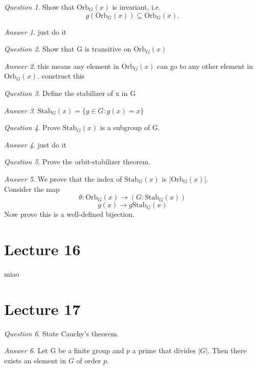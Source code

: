 \documentclass[]{article}
\theoremstyle{remark}
\theoremstyle{qnstyle}
\newtheorem{question}{Question}
\theoremstyle{answerstyle}
\newtheorem*{answer}{Answer}
\begin{document}
\begin{question}
    Show that $\text{Orb}_G(x)$ is invariant, i.e. 
    $$g(\text{Orb}_G(x)) \subseteq \text{Orb}_G(x).$$
\end{question}
\begin{answer}
    just do it
\end{answer}

\begin{question}
    Show that G is transitive on $\text{Orb}_G(x)$
\end{question}
\begin{answer}
    this means any element in $\text{Orb}_G(x)$ can go to any other element in $\text{Orb}_G(x)$. construct this
\end{answer}

\begin{question}
    Define the stabilizer of x in G
\end{question}
\begin{answer}
        $\text{Stab}_G(x) = \{g \in G: g(x) = x\}$
\end{answer}  

\begin{question}
    Prove $\text{Stab}_G(x)$ is a subgroup of G.
\end{question}
\begin{answer}
    just do it
\end{answer}  

\begin{question}
    Prove the orbit-stabilizer theorem.
\end{question}
\begin{answer}
    We prove that the index of $\text{Stab}_G(x)$ is $| \text{Orb}_G(x)|$. \\
    Consider the map
    $$\theta: \text{Orb}_G(x) \to (G:\text{Stab}_G(x))$$
    $$g(x) \to g \text{Stab}_G(x)$$
    Now prove this is a well-defined bijection.
\end{answer}  


\section* {Lecture 16}
miao
\section* {Lecture 17}

\begin{question}
    State Cauchy's theorem.
\end{question}
\begin{answer}
    Let G be a finite group and $p$ a prime that divides $|G|$. Then there 
    exists an element in $G$ of order $p$.
\end{answer}  
\end{document}
